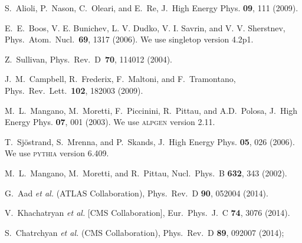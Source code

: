 \documentclass[aps,prl,twocolumn,showpacs,superscriptaddress,groupedaddress]{revtex4}  %
\newcommand{\singletop} {\sc singletop}
\newcommand{\pythia}    {\mbox{\textsc{pythia}}}
\newcommand{\alpgen}    {\mbox{\textsc{alpgen}}}
\begin{document}
\begin{thebibliography}{99}
  S.~Alioli, P.~Nason, C.~Oleari, and E.~Re,
  J.\ High Energy Phys. {\bf 09}, 111 (2009).

  E.~E.~Boos, V. E. Bunichev,  L. V. Dudko,  V. I. Savrin, and  V. V. Sherstnev,
  Phys.\ Atom.\ Nucl.\ {\bf 69}, 1317 (2006). We use {\singletop}
  version 4.2p1.

  Z.~Sullivan, Phys.\ Rev.\ D~{\bf 70}, 114012 (2004).

  J.~M.~Campbell, R.~Frederix, F.~Maltoni, and F.~Tramontano,
  Phys.\ Rev.\ Lett.\ {\bf 102}, 182003 (2009). 

  M.~L.~Mangano, M.~Moretti, F.~Piccinini, R.~Pittau, and A.D.~Polosa,
  J.\ High Energy Phys. {\bf 07}, 001 (2003). We use {\alpgen} version 2.11.

  T.~Sj\"{o}strand, S.~Mrenna, and P.~Skands,
  J.\ High Energy Phys. {\bf 05}, 026 (2006). We use {\pythia} version 6.409.

M.~L.~Mangano, M.~Moretti, and R.~Pittau, 
Nucl.\ Phys.\ B {\bf 632}, 343 (2002).

  G.~Aad {\it et al.}  (ATLAS Collaboration),
  Phys.\ Rev.\ D {\bf 90}, 052004 (2014).

  V.~Khachatryan {\it et al.}  [CMS Collaboration],
  Eur.\ Phys.\ J.\ C {\bf 74}, 3076 (2014).

  S.~Chatrchyan {\it et al.}  (CMS Collaboration),
  Phys.\ Rev.\ D {\bf 89}, 092007 (2014);


\end{thebibliography}
\end{document}
